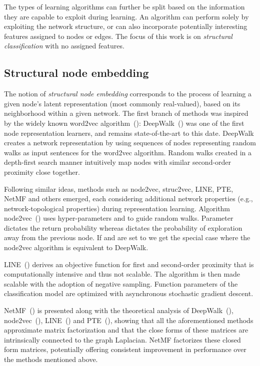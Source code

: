 \documentclass[twoside,11pt]{article}
\begin{document}
The types of learning algorithms can further be split based on the information they are capable to exploit during learning. An algorithm can perform solely by exploiting the network structure, or can also incorporate potentially interesting features assigned to nodes or edges. The focus of this work is on \emph{structural classification} with no assigned features.

\subsection{Structural node embedding}
\label{sec:strucnn}
The notion of \emph{structural node embedding} corresponds to the process of learning a given node's latent representation (most commonly real-valued), based on its neighborhood within a given network. The first branch of methods was inspired by the widely known word2vec algorithm~(\cite{NIPS2013_5021}):  DeepWalk~(\cite{Perozzi2014deepwalk}) was one of the first node representation learners, and remains state-of-the-art to this date. DeepWalk creates a network representation by using sequences of nodes representing random walks as input sentences for the word2vec algorithm. Random walks created in a depth-first search manner intuitively map nodes with similar second-order proximity close together.

Following similar ideas, methods such as node2vec, struc2vec, LINE, PTE, NetMF and others emerged, each considering additional network properties (e.g., network-topological properties) during representation learning. Algorithm node2vec~(\cite{grover2016node2vec}) uses hyper-parameters  and  to guide random walks. Parameter  dictates the return probability whereas  dictates the probability of exploration away from the previous node. If  and  are set to  we get the special case where the node2vec algorithm is equivalent to DeepWalk. 

LINE~(\cite{tang2015line}) derives an objective function for first and second-order proximity that is computationally intensive and thus not scalable. The algorithm is then made scalable with the adoption of negative sampling. Function parameters of the classification model are optimized with asynchronous stochastic gradient descent.

NetMF~(\cite{qiu2018network}) is presented along with the theoretical analysis of DeepWalk~(\cite{Perozzi2014deepwalk}), node2vec~(\cite{grover2016node2vec}), LINE~(\cite{tang2015line}) and PTE~(\cite{Tang2015PTEPT}), showing that all the aforementioned methods approximate matrix factorization and that the close forms of these matrices are intrinsically connected to the graph Laplacian. NetMF factorizes these closed form matrices, potentially offering consistent improvement in performance over the methods mentioned above.
\end{document}
